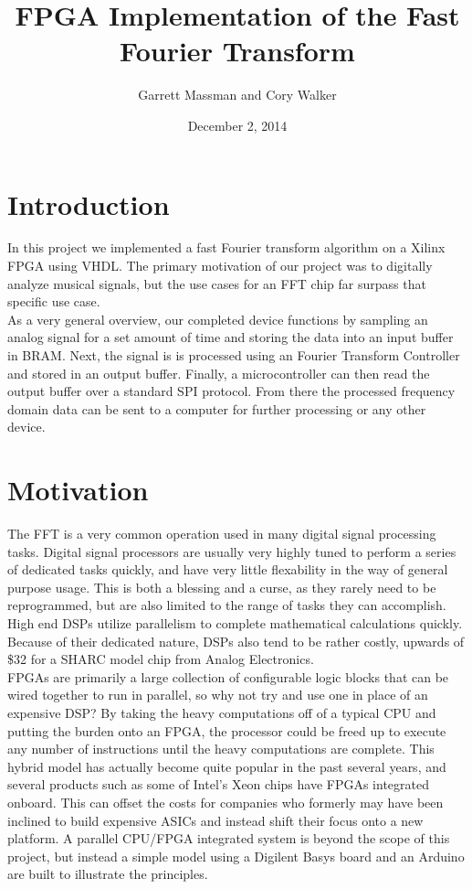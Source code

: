 \documentclass[12pt]{article}
\title{\textbf{FPGA Implementation of the Fast Fourier Transform}}
\date{December 2, 2014}
\author{Garrett Massman and Cory Walker}
\begin{document}
  \maketitle
  \clearpage

  \section*{Introduction}
    In this project we implemented a fast Fourier transform algorithm on a Xilinx FPGA using VHDL. The primary motivation of our project was to digitally analyze musical signals, but the use cases for an FFT chip far surpass that specific use case. \\
    
    As a very general overview, our completed device functions by sampling an analog signal for a set amount of time and storing the data into an input buffer in BRAM. Next, the signal is is processed using an Fourier Transform Controller and stored in an output buffer. Finally, a microcontroller can then read the output buffer over a standard SPI protocol. From there the processed frequency domain data can be sent to a computer for further processing or any other device.

  \section*{Motivation}
    The FFT is a very common operation used in many digital signal processing tasks.
    Digital signal processors are usually very highly tuned to perform a series of dedicated tasks quickly, and have very little flexability in the way of general purpose usage.
    This is both a blessing and a curse, as they rarely need to be reprogrammed, but are also limited to the range of tasks they can accomplish.
    High end DSPs utilize parallelism to complete mathematical calculations quickly.
    Because of their dedicated nature, DSPs also tend to be rather costly, upwards of \$32 for a SHARC model chip from Analog Electronics.\\

    FPGAs are primarily a large collection of configurable logic blocks that can be wired together to run in parallel, so why not try and use one in place of an expensive DSP?
    By taking the heavy computations off of a typical CPU and putting the burden onto an FPGA, the processor could be freed up to execute any number of instructions until the heavy computations are complete.
    This hybrid model has actually become quite popular in the past several years, and several products such as some of Intel's Xeon chips have FPGAs integrated onboard.
    This can offset the costs for companies who formerly may have been inclined to build expensive ASICs and instead shift their focus onto a new platform.
    A parallel CPU/FPGA integrated system is beyond the scope of this project, but instead a simple model using a Digilent Basys board and an Arduino are built to illustrate the principles.
\end{document}
